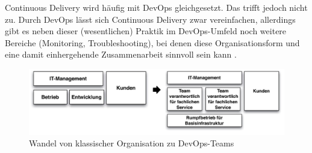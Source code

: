 Continuous Delivery wird häufig mit DevOps gleichgesetzt. Das trifft jedoch nicht zu. Durch DevOps lässt sich Continuous Delivery zwar vereinfachen, allerdings gibt es neben dieser (wesentlichen) Praktik im DevOps-Umfeld noch weitere Bereiche (Monitoring, Troubleshooting), bei denen diese Organisationsform und eine damit einhergehende Zusammenarbeit sinnvoll sein kann \cite{Wolff.2016}.
\begin{figure}[h!]
	\centering
	\includegraphics[width=0.8\linewidth]{images/devops}
	\caption{Wandel von klassischer Organisation zu DevOps-Teams} %
	\label{fig:devops}
\end{figure}
